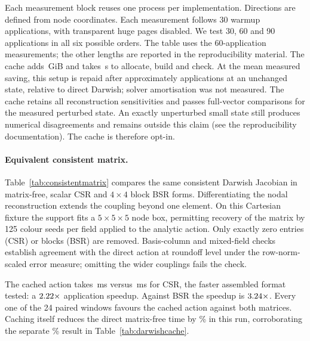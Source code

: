 \documentclass[sigconf,nonacm]{acmart}
\begin{document}
Each measurement block reuses one process per implementation. Directions
are defined from node coordinates. Each measurement follows 30 warmup
applications, with transparent huge pages disabled. We test 30, 60 and 90
applications in all six possible orders. The table uses the 60-application
measurements; the other lengths are reported in the reproducibility material. The cache adds \dcGiB{}\,GiB and takes
\dcSetup{}\,s to allocate, build and check. At the mean measured saving, this
setup is repaid after approximately \dcPayoff{} applications at an unchanged
state, relative to direct Darwish; solver amortisation was not measured.
The cache retains all reconstruction sensitivities and passes full-vector
comparisons for the measured perturbed state. An exactly unperturbed small
state still produces numerical disagreements and remains outside this claim
(see the reproducibility documentation). The cache is therefore opt-in.


\paragraph{Equivalent consistent matrix.}
Table~\ref{tab:consistentmatrix} compares the same consistent Darwish Jacobian
in matrix-free, scalar CSR and $4\times4$ block BSR forms. Differentiating the
nodal reconstruction extends the coupling beyond one element. On this Cartesian
fixture the support fits a $5\times5\times5$ node box, permitting recovery of the
matrix by 125 colour seeds per field applied to the analytic action. Only exactly
zero entries (CSR) or blocks (BSR) are removed. Basis-column and mixed-field
checks establish agreement with the direct action at roundoff level under the
row-norm-scaled error measure; omitting the wider couplings fails the check.

The cached action takes \cmCachedMs{}\,ms versus \cmCsrMs{}\,ms for CSR, the
faster assembled format tested: a $2.22\times$ application speedup.
Against BSR the speedup is $3.24\times$. Every one of the 24 paired
windows favours the cached action against both matrices. Caching itself reduces
the direct matrix-free time by \cmTimeReduction\% in this run, corroborating
the separate \dcTimeReduction\% result in Table~\ref{tab:darwishcache}.
\end{document}
